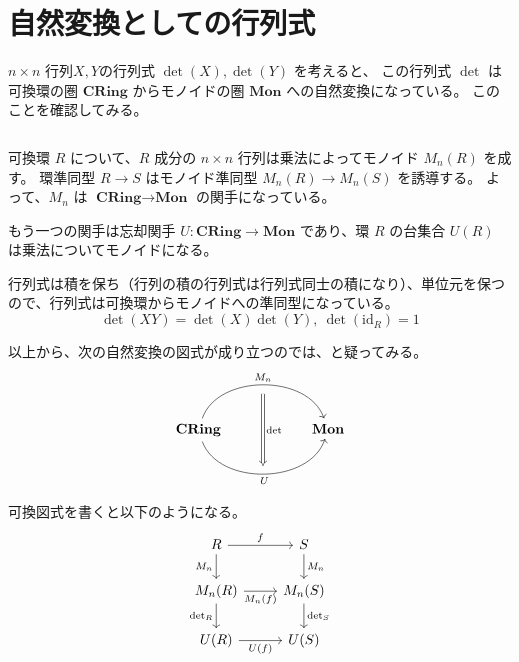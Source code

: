 \documentclass[uplatex,a4j,12pt,dvipdfmx]{jsarticle}
\begin{document}
\section{自然変換としての行列式}

$n \times n$ 行列$X,Y$の行列式 $\det(X), \det(Y)$ を考えると、
この行列式 $\det$ は可換環の圏 $\textbf{CRing}$ からモノイドの圏 $\textbf{Mon}$ への自然変換になっている。
このことを確認してみる。

${}$

可換環 $R$ について、$R$ 成分の $n \times n$ 行列は乗法によってモノイド $M_{n}(R)$ を成す。
環準同型 $R \to S$ はモノイド準同型 $M_{n} (R) \to M_{n} (S)$ を誘導する。
よって、$M_{n}$ は $\textbf{CRing} \to \textbf{Mon}$ の関手になっている。

もう一つの関手は忘却関手 $U : \textbf{CRing} \to \textbf{Mon}$ であり、環 $R$ の台集合 $U(R)$ は乗法についてモノイドになる。

行列式は積を保ち（行列の積の行列式は行列式同士の積になり）、単位元を保つので、行列式は可換環からモノイドへの準同型になっている。
$$\det(XY) = \det(X)\det(Y), \ \det(\text{id}_{R}) = 1$$

以上から、次の自然変換の図式が成り立つのでは、と疑ってみる。
\[
	\begin{tikzcd}
		& {} \arrow[dd, "\det", Rightarrow, shift right] &              \\
		\textbf{CRing} \arrow[rr, "M_{n}", bend left=71] \arrow[rr, "U"', bend right=71] &                                                & \textbf{Mon} \\
		& {}                                             &
	\end{tikzcd}
\]

可換図式を書くと以下のようになる。
\[
	\begin{tikzcd}
		R \arrow[r, "f"]
		\arrow[d, "M_n"']
		&
		S \arrow[d, "M_n"] \\
		M_n(R) \arrow[r, "M_n(f)"']
		\arrow[d, "\det_R"']
		&
		M_n(S) \arrow[d, "\det_S"] \\
		U(R) \arrow[r, "U(f)"']
		&
		U(S)
	\end{tikzcd}
\]
\end{document}
